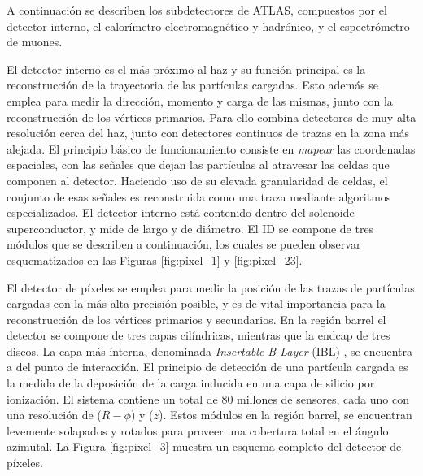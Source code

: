A continuación se describen los subdetectores de ATLAS, compuestos por el detector interno, el calorímetro electromagnético y hadrónico, y el espectrómetro de muones.



El detector interno es el más próximo al haz y su función principal es la reconstrucción de la trayectoria de las partículas cargadas. Esto además se emplea para medir la dirección, momento y carga de las mismas, junto con la reconstrucción de los vértices primarios. Para ello combina detectores de muy alta resolución cerca del haz, junto con detectores continuos de trazas en la zona más alejada. 
El principio básico de funcionamiento consiste en \textit{mapear} las coordenadas espaciales, con las señales que dejan las partículas al atravesar las celdas que componen al detector. 
Haciendo uso de su elevada granularidad de celdas, el conjunto de esas señales es reconstruida como una traza mediante algoritmos especializados. 
El detector interno está contenido dentro del solenoide superconductor, y mide  de largo y  de diámetro. El ID se compone de tres módulos que se describen a continuación, los cuales se pueden observar esquematizados en las Figuras \ref{fig:pixel_1} y \ref{fig:pixel_23}.




El detector de píxeles se emplea para medir la posición de las trazas de partículas cargadas con la más alta precisión posible, y es de vital importancia para la reconstrucción de los vértices primarios y secundarios. En la región barrel el detector se compone de tres capas cilíndricas, mientras que la endcap de tres discos. La capa más interna, denominada \textit{Insertable B-Layer} (IBL) \cite{ATLAS-TDR-2010-19}, se encuentra a  del punto de interacción.
El principio de detección de una partícula cargada es la medida de la deposición de la carga inducida en una capa de silicio por ionización. El sistema contiene un total de $80$ millones de sensores, cada uno con una resolución de  ($R-\phi$) y  ($z$). Estos módulos en la región barrel, se encuentran levemente solapados y rotados para proveer una cobertura total en el ángulo azimutal. La Figura \ref{fig:pixel_3} muestra un esquema completo del detector de píxeles.

